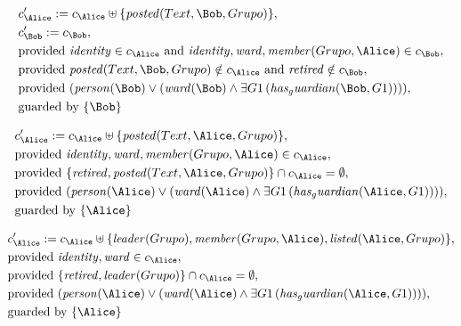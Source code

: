 \begin{align*}
&
c'_
{
\Alice
}
 := 
c_
{
\Alice
}
 \uplus 
\{
\mathit{
posted
}
(
Text
,
\Bob
,
Grupo
)
\}
,\\
&
c'_
{
\Bob
}
 := 
c_
{
\Bob
}
,\\
&
\text{provided } 
\mathit{
identity
}
 \in c_
{
\Alice
}
 \text{ and } 
\mathit{
identity
}
,
\mathit{
ward
}
,
\mathit{
member
}
(
Grupo
,
\Alice
)
 \in c_
{
\Bob
}
,\\
&
\text{provided } 
\mathit{
posted
}
(
Text
,
\Bob
,
Grupo
)
 \notin c_
{
\Alice
}
 \text{ and } 
\mathit{
retired
}
 \notin c_
{
\Bob
}
,\\
&
\text{provided } 
(
\mathit{
person
}
(
\Bob
)
\lor
(
\mathit{
ward
}
(
\Bob
)
\land
\exists 
G1
\,(
\mathit{
has_guardian
}
(
\Bob
,
G1
)
)
)
)
,\\
&
\text{guarded by } \{
\Bob
\}
\end{align*}

\begin{align*}
&
c'_
{
\Alice
}
 := 
c_
{
\Alice
}
 \uplus 
\{
\mathit{
posted
}
(
Text
,
\Alice
,
Grupo
)
\}
,\\
&
\text{provided } 
\mathit{
identity
}
,
\mathit{
ward
}
,
\mathit{
member
}
(
Grupo
,
\Alice
)
 \in c_
{
\Alice
}
,\\
&
\text{provided } 
\{
\mathit{
retired
}
,
\mathit{
posted
}
(
Text
,
\Alice
,
Grupo
)
\}
 \cap c_
{
\Alice
}
 = \emptyset
,\\
&
\text{provided } 
(
\mathit{
person
}
(
\Alice
)
\lor
(
\mathit{
ward
}
(
\Alice
)
\land
\exists 
G1
\,(
\mathit{
has_guardian
}
(
\Alice
,
G1
)
)
)
)
,\\
&
\text{guarded by } \{
\Alice
\}
\end{align*}

\begin{align*}
&
c'_
{
\Alice
}
 := 
c_
{
\Alice
}
 \uplus 
\{
\mathit{
leader
}
(
Grupo
)
,
\mathit{
member
}
(
Grupo
,
\Alice
)
,
\mathit{
listed
}
(
\Alice
,
Grupo
)
\}
,\\
&
\text{provided } 
\mathit{
identity
}
,
\mathit{
ward
}
 \in c_
{
\Alice
}
,\\
&
\text{provided } 
\{
\mathit{
retired
}
,
\mathit{
leader
}
(
Grupo
)
\}
 \cap c_
{
\Alice
}
 = \emptyset
,\\
&
\text{provided } 
(
\mathit{
person
}
(
\Alice
)
\lor
(
\mathit{
ward
}
(
\Alice
)
\land
\exists 
G1
\,(
\mathit{
has_guardian
}
(
\Alice
,
G1
)
)
)
)
,\\
&
\text{guarded by } \{
\Alice
\}
\end{align*}
